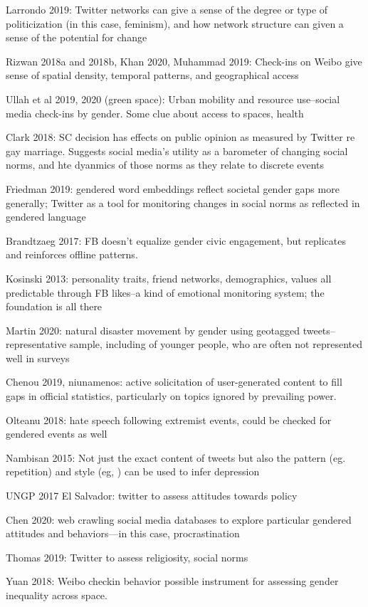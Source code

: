 \documentclass{article}
\begin{document}
Larrondo 2019: Twitter networks can give a sense of the degree or type of politicization (in this case, feminism), and how network structure can given a sense of the potential for change

Rizwan 2018a and 2018b, Khan 2020, Muhammad 2019: Check-ins on Weibo give sense of spatial density, temporal patterns, and geographical access 

Ullah et al 2019, 2020 (green space): Urban mobility and resource use--social media check-ins by gender. Some clue about access to spaces, health

Clark 2018: SC decision has effects on public opinion as measured by Twitter re gay marriage. Suggests social media's utility as a barometer of changing social norms, and hte dyanmics of those norms as they relate to discrete events

Friedman 2019: gendered word embeddings reflect societal gender gaps more generally; Twitter as a tool for monitoring changes in social norms as reflected in gendered language

Brandtzaeg 2017: FB doesn't equalize gender civic engagement, but replicates and reinforces offline patterns.

Kosinski 2013: personality traits, friend networks, demographics, values all predictable through FB likes--a kind of emotional monitoring system; the foundation is all there

Martin 2020: natural disaster movement by gender using geotagged tweets--representative sample, including of younger people, who are often not represented well in surveys

Chenou 2019, niunamenos: active solicitation of user-generated content to fill gaps in official statistics, particularly on topics ignored by prevailing power.

Olteanu 2018: hate speech following extremist events, could be checked for gendered events as well

Nambisan 2015: Not just the exact content of tweets but also the pattern (eg. repetition) and style (eg, ) can be used to infer depression

UNGP 2017 El Salvador: twitter to assess attitudes towards policy

Chen 2020: web crawling social media databases to explore particular gendered attitudes and behaviors---in this case, procrastination

Thomas 2019: Twitter to assess religiosity, social norms

Yuan 2018: Weibo checkin behavior possible instrument for assessing gender inequality across space.
\end{document}
